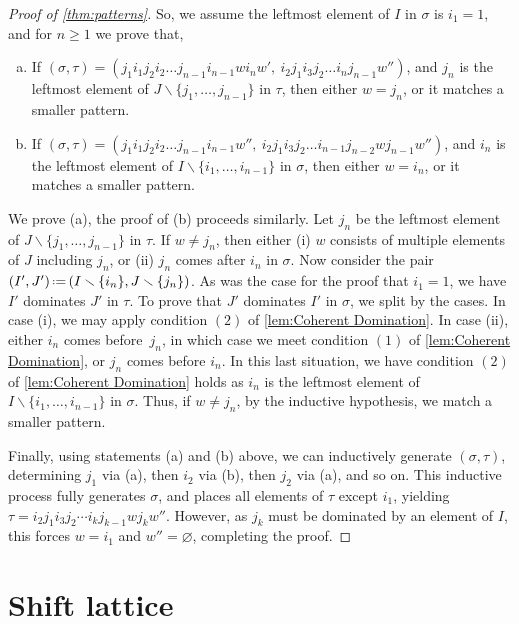 \documentclass{amsart}
\theoremstyle{definition}
\newcommand{\ssm}{\smallsetminus} %
\newcommand{\eqdef}{\mbox{\,\raisebox{0.2ex}{\scriptsize\ensuremath{\mathrm:}}\ensuremath{=}\,}} %
\begin{document}
\begin{proof}[Proof of \cref{thm:patterns}]
So, we assume the leftmost element of $I$ in $\sigma$ is $i_1=1$, and for $n\geq1$ we prove that,
\begin{enumerate}[(a)]
\item If $(\sigma,\tau)=(j_1 i_1 j_2 i_2 \dots j_{n-1} i_{n-1} w i_{n} w', \ i_2 j_1 i_3 j_2 \dots i_{n}j_{n-1}w'') $, and $j_n$ is the leftmost element of $J\ssm \{j_1, \dots, j_{n-1}\}$ in $\tau$, then either $w = j_n$, or it matches a smaller pattern.
\item If $(\sigma,\tau)=(j_1 i_1 j_2 i_2 \dots j_{n-1} i_{n-1} w'', \ i_2 j_1 i_3 j_2 \dots i_{n-1}j_{n-2} w j_{n-1} w'')$, and $i_n$ is the leftmost element of ${I\ssm \{i_1, \dots, i_{n-1}\}}$ in $\sigma$, then either $w = i_n$, or it matches a smaller pattern.
\end{enumerate}
We prove (a), the proof of (b) proceeds similarly. 
Let $j_n$ be the leftmost element of $J\ssm \{j_1, \dots, j_{n-1} \}$ in $\tau$.
If $w\neq j_n$, then either (i) $w$ consists of multiple elements of $J$ including $j_n$, or (ii) $j_n$ comes after $i_n$ in $\sigma$.
Now consider the pair $(I',J') \eqdef (I\ssm \{i_n\}, J \ssm \{j_n\})$.
As was the case for the proof that $i_1=1$, we have $I'$ dominates $J'$ in $\tau$.
To prove that $J'$ dominates $I'$ in $\sigma$, we split by the cases.
In case (i), we may apply condition $(2)$ of \cref{lem:Coherent Domination}.
In case (ii), either $i_n$ comes before~$j_n$, in which case we meet condition $(1)$ of \cref{lem:Coherent Domination}, or $j_n$ comes before $i_n$.
In this last situation, we have condition $(2)$ of \cref{lem:Coherent Domination} holds as $i_n$ is the leftmost element of~${I\ssm \{i_1, \dots, i_{n-1}\}}$ in $\sigma$.
Thus, if $w \neq j_n$, by the inductive hypothesis, we match a smaller pattern.

Finally, using statements (a) and (b) above, we can inductively generate $(\sigma,\tau)$, determining $j_1$ via (a), then $i_2$ via (b), then $j_2$ via (a), and so on.
This inductive process fully generates $\sigma$, and places all elements of $\tau$ except $i_1$, yielding $\tau=i_2 j_1 i_3 j_2 \cdots i_k j_{k-1} w j_k w''$.
However, as $j_k$ must be dominated by an element of $I$, this forces $w = i_1$ and $w'' =\varnothing$, completing the proof.
\end{proof}


\newpage
\section{Shift lattice}
\label{sec:shifts}
\end{document}
